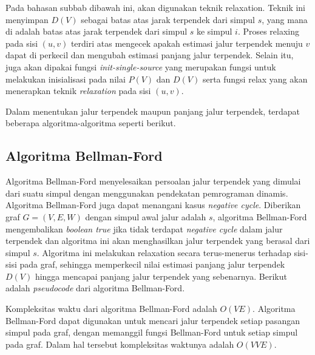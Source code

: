 Pada bahasan subbab dibawah ini, akan digunakan teknik relaxation. Teknik ini menyimpan $D(V)$ sebagai batas atas jarak terpendek dari simpul $s$, 
yang mana di adalah batas atas jarak terpendek dari simpul $s$ ke simpul $i$. Proses relaxing pada sisi $(u, v)$ terdiri atas mengecek apakah estimasi 
jalur terpendek menuju $v$ dapat di perkecil dan mengubah estimasi panjang jalur terpendek. Selain itu, juga akan dipakai fungsi \textit{init-single-source} 
yang merupakan fungsi untuk melakukan inisialisasi pada nilai $P(V)$ dan $D(V)$ serta fungsi relax yang akan menerapkan teknik \textit{relaxation} pada sisi $(u,v)$.

\medskip


\medskip


Dalam menentukan jalur terpendek maupun panjang jalur terpendek, terdapat beberapa algoritma-algoritma seperti berikut.

    \subsection{Algoritma Bellman-Ford}
        Algoritma Bellman-Ford menyelesaikan persoalan jalur terpendek yang dimulai dari suatu simpul dengan menggunakan pendekatan pemrograman dinamis. 
        Algoritma Bellman-Ford juga dapat menangani kasus \textit{negative cycle}. Diberikan 
        graf $G = (V, E, W)$ dengan simpul awal jalur adalah $s$, algoritma Bellman-Ford mengembalikan \textit{boolean true} jika tidak terdapat \textit{negative cycle} dalam 
        jalur terpendek dan algoritma ini akan menghasilkan jalur terpendek yang berasal dari simpul $s$. Algoritma ini melakukan \textit{}{relaxation} secara terus-menerus 
        terhadap sisi-sisi pada graf, sehingga memperkecil nilai estimasi panjang jalur terpendek $D(V)$ hingga mencapai panjang jalur terpendek yang sebenarnya. 
        Berikut adalah \textit{pseudocode} dari algoritma Bellman-Ford.

        \medskip
        

        Kompleksitas waktu dari algoritma Bellman-Ford adalah $O(VE)$. Algoritma Bellman-Ford dapat digunakan untuk mencari jalur terpendek setiap pasangan simpul pada 
        graf, dengan memanggil fungsi Bellman-Ford untuk setiap simpul pada graf.  Dalam hal tersebut kompleksitas waktunya adalah $O(VVE)$.

